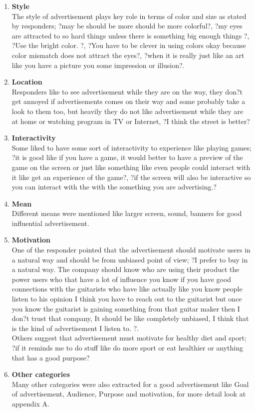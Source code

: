 \begin{enumerate}
\item \textbf{Style} \\	
The style of advertisement plays key role in terms of color and size as stated by responders; ?may be should be more should be more colorful?, ?my eyes are attracted to so hard things unless there is something big enough things ?, ?Use the bright color. ?, ?You have to be clever in using colors okay because color mismatch does not attract the eyes?, ?when it is really just like an art like you have a picture you some impression or illusion?.

\item \textbf{Location} \\	
Responders like to see advertisement while they are on the way, they don?t get annoyed if advertisements comes on their way and some probably take a look to them too, but heavily they do not like advertisement while they are at home or watching program in TV or Internet, ?I think the street is better?

\item \textbf{Interactivity} \\	
Some liked to have some sort of interactivity to experience like playing games; ?it is good like if you have a game, it would better to have a preview of the game on the screen or just like something like even people could interact with it like get an experience of the game?, ?if the screen will also be interactive so you can interact with the with the something you are advertising.?

\item \textbf{Mean} \\
Different means were mentioned like larger screen, sound, banners for good influential advertisement.

\item \textbf{Motivation} \\
One of the responder pointed that the advertisement should motivate users in a natural way and should be from unbiased point of view; ?I prefer to buy in a natural way. The company should know who are using their product the power users who that have a lot of influence you know if you have good connections with the guitarists who have like actually like you know people listen to his opinion I think you have to reach out to the guitarist but once you know the guitarist is gaining something from that guitar maker then I don?t trust that company, It should be like completely unbiased, I think that is the kind of advertisement I listen to. ?. \\

Others suggest that advertisement must motivate for healthy diet and sport; ?if it reminds me to do stuff like do more sport or eat healthier or anything that has a good purpose?

\item \textbf{Other categories} \\
Many other categories were also extracted for a good advertisement like Goal of advertisement, Audience, Purpose and motivation, for more detail look at appendix A.
		
\end{enumerate}



